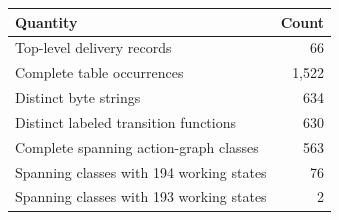 \begin{center}
\begin{tabular}{@{}lr@{}}
\toprule Quantity & Count\\\midrule
Top-level delivery records & 66\\
Complete table occurrences & 1,522\\
Distinct byte strings & 634\\
Distinct labeled transition functions & 630\\
Complete spanning action-graph classes & 563\\
Spanning classes with 194 working states & 76\\
Spanning classes with 193 working states & 2\\
\bottomrule
\end{tabular}
\end{center}
